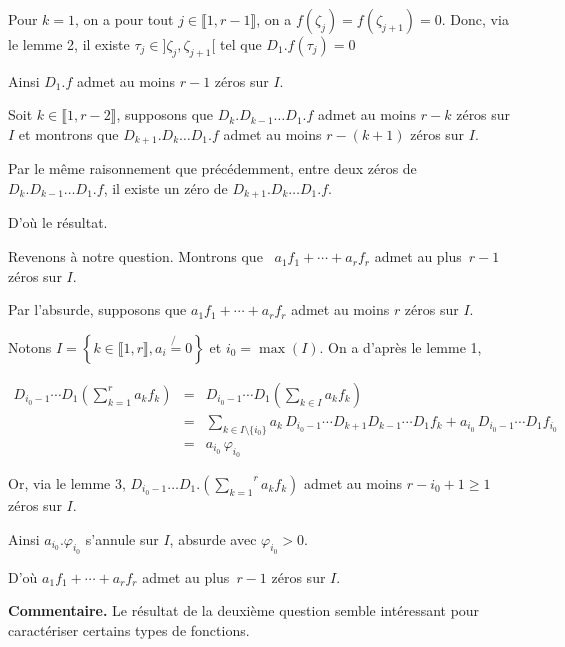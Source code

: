 Pour $k = 1$, on a pour tout $j \in \llbracket 1, r - 1 \rrbracket$, on a $f
(\zeta_j) = f (\zeta_{j + 1}) = 0$. Donc, via le lemme 2, il existe $\tau_j
\in] \zeta_j, \zeta_{j + 1} [$ tel que $D_1 .f (\tau_j) = 0$

Ainsi $D_1 .f$ admet au moins $r - 1$ z{\'e}ros sur $I$.

Soit $k \in \llbracket 1, r - 2 \rrbracket$, supposons que $D_k .D_{k - 1}
\ldots D_1 .f$ admet au moins $r - k$ z{\'e}ros sur $I$ et montrons que $D_{k
+ 1} .D_k \ldots D_1 .f$ admet au moins $r - (k + 1)$ z{\'e}ros sur $I$.

Par le m{\^e}me raisonnement que pr{\'e}c{\'e}demment, entre deux z{\'e}ros de
\ $D_k .D_{k - 1} \ldots D_1 .f$, il existe un z{\'e}ro de $D_{k + 1} .D_k
\ldots D_1 .f$.

D'o{\`u} le r{\'e}sultat.

Revenons {\`a} notre question. Montrons que \ $a_1 f_1 + \cdots + a_r f_r$
admet au plus~$r - 1$ z{\'e}ros sur $I$.

Par l'absurde, supposons que $a_1 f_1 + \cdots + a_r f_r$ admet au moins $r$
z{\'e}ros sur $I$.

Notons $I = \left\{ k \in \llbracket 1, r \rrbracket, a_i \not{=} 0 \right\}$
et $i_0 = \max (I)$. On a d'apr{\`e}s le lemme 1,

\begin{eqnarray*}
  D_{i_0 - 1} \cdots D_1 \left( \sum_{k = 1}^{r} a_k f_k \right) 
  &=& D_{i_0 - 1} \cdots D_1 \left( \sum_{k \in I} a_k f_k \right) \\
  &=& \sum_{k \in I \setminus \{ i_0 \}} a_k \, D_{i_0 - 1} \cdots D_{k+1} D_{k - 1} \cdots D_1 f_k + a_{i_0} \, D_{i_0 - 1} \cdots D_1 f_{i_0} \\
  &=& a_{i_0} \, \varphi_{i_0}
\end{eqnarray*}



Or, via le lemme 3, $D_{i_0 - 1} \ldots D_1 . \left( \overset{r}{\underset{k =
1}{\sum}} a_k f_k \right)$ admet au moins $r - i_0 + 1 \geqslant 1$ z{\'e}ros
sur $I$.

Ainsi $a_{i_0} . \varphi_{i_0}$ s'annule sur $I$, absurde avec $\varphi_{i_0}
> 0$.

D'o{\`u} $a_1 f_1 + \cdots + a_r f_r$ admet au plus~$r - 1$ z{\'e}ros sur $I$.

\textbf{Commentaire.} Le r{\'e}sultat de la deuxi{\`e}me question semble
int{\'e}ressant pour caract{\'e}riser certains types de fonctions.

